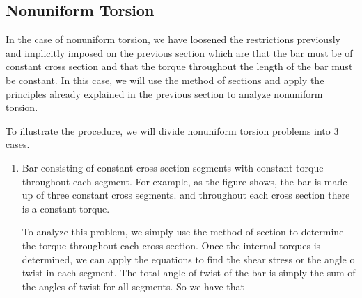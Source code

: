 \documentclass[
10pt,
a4paper,
openany,
svgnames,
]{book} %
\begin{document}
\subsection{Nonuniform Torsion}

In the case of nonuniform torsion, we have loosened the restrictions previously and implicitly imposed on the previous section which are that the bar must be of constant cross section and that the torque throughout the length of the bar must be constant. In this case, we will use the method of sections and apply the principles already explained in the previous section to analyze nonuniform torsion.

To illustrate the procedure, we will divide nonuniform torsion problems into 3 cases.

\begin{enumerate}
\item Bar consisting of constant cross section segments with constant torque throughout each segment. For example, as the figure shows, the bar is made up of three constant cross segments. and throughout each cross section there is a constant torque.
  
  To analyze this problem, we simply use the method of section to determine the torque throughout each cross section. Once the internal torques is determined, we can apply the equations to find the shear stress or the angle o twist in each segment. The total angle of twist of the bar is simply the sum of the angles of twist for all segments. So we have that

  \begin{figure}[h]
    \centering
  \end{figure}
  

\end{enumerate}
\end{document}
